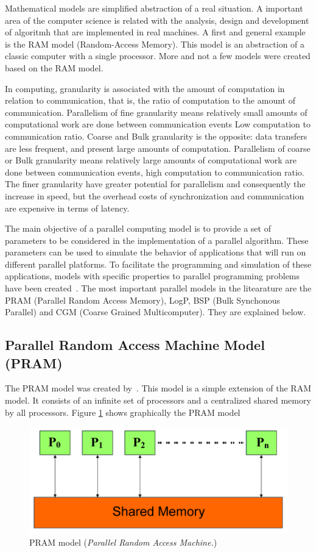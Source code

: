Mathematical models are simplified abstraction of a real situation. A important area of the computer science is related with the analysis, design and development of algoritmh that are implemented in real machines. A first and general example is the RAM model (Random-Access Memory). This model is an abstraction of a classic computer with a single processor. More and not a few models were created based on the RAM model.

In computing, granularity is associated with the amount of computation in relation to communication, that is, the ratio of computation to the amount of communication. Parallelism of fine granularity means relatively small amounts of computational work are done between communication events
Low computation to communication ratio. Coarse and Bulk granularity is the opposite: data transfers are less frequent, and present large amounts of computation. Parallelism of coarse or Bulk granularity means relatively large amounts of computational work are done between communication events, high computation to communication ratio. The finer granularity have greater potential for parallelism and consequently the increase in speed, but the overhead costs of synchronization and communication are expensive in terms of latency.

The main objective of a parallel computing model is to provide a set of parameters to be considered in the implementation of a parallel algorithm. These parameters can be used to simulate the behavior of applications that will run on different parallel platforms. To facilitate the programming and simulation of these applications, models with specific properties to parallel programming problems have been created~\citep{Skillicorn:1998:MLP}. The most important parallel models in the litearature are the PRAM (Parallel Random Access Memory), LogP, BSP (Bulk Synchonous Parallel) and CGM (Coarse Grained Multicomputer). They are explained below.

\subsection{Parallel Random Access Machine Model (PRAM)}
The PRAM model was created by~\cite{Fortune:1978:PRAM}. This model is a simple extension of the RAM model. It consists of an infinite set of processors and a centralized shared memory by all processors. Figure \ref{fig:Pram} shows graphically the PRAM model

\begin{figure}[htpb]
\centering
\includegraphics[scale=.6]{./images/Pram.png}
\caption{PRAM  model (\textit{Parallel Random Access Machine.})}
\label{fig:Pram}
\end{figure}

